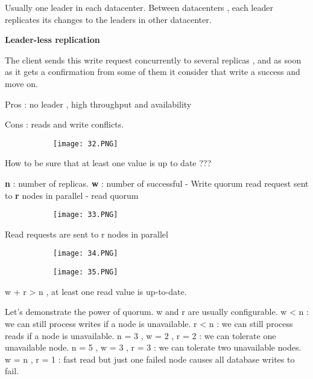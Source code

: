 \documentclass{article}
\begin{document}
Usually one leader in each datacenter. Between datacenters , each leader replicates its changes to the leaders in other datacenter.


\vspace{2mm}
\textbf{Leader-less replication}

The client sends this write request concurrently to several replicas , and as soon as it gets a confirmation from some of them it consider that write a success and move on.

Pros : no leader , high throughput and availability

Cons : reads and write conflicts.

\begin{figure}[ht!]
  \centering
  \begin{subfigure}[b]{0.45\linewidth}
    \texttt{[image: 32.PNG]}
  \end{subfigure}
\end{figure}

How to be sure that at least one value is up to date ???

\textbf{n} : number of replicas.
\textbf{w} : number of successful - Write quorum
read request sent to \textbf{r} nodes in parallel - read quorum

\begin{figure}[ht!]
  \centering
  \begin{subfigure}[b]{0.45\linewidth}
    \texttt{[image: 33.PNG]}
  \end{subfigure}
\end{figure}

Read requests are sent to r nodes in parallel

\begin{figure}[ht!]
  \centering
  \begin{subfigure}[b]{0.39\linewidth}
    \texttt{[image: 34.PNG]}
  \end{subfigure}
  \begin{subfigure}[b]{0.4\textwidth}
         \centering
         \texttt{[image: 35.PNG]}
     \end{subfigure}
\end{figure}

w + r > n , at least one read value is up-to-date. 

Let's demonstrate the power of quorum. w and r are usually configurable.
w < n : we can still process writes if a node is unavailable.
r < n : we can still process reads if a node is unavailable.
n = 3 , w = 2 , r = 2 : we can tolerate one unavailable node.
n = 5 , w = 3 , r = 3 : we can tolerate two unavailable nodes.
w = n , r = 1 : fast read but just one failed node causes all database writes to fail.
\end{document}
